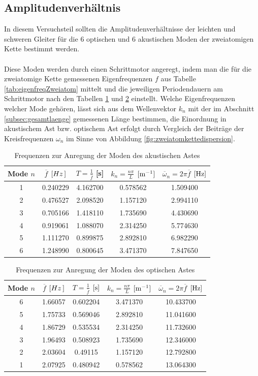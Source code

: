 \documentclass[a4paper,titlepage]{scrartcl}
\numberwithin{equation}{section}
\begin{document}
\subsection{Amplitudenverhältnis}
In diesem Versuchsteil sollten die Amplitudenverhältnisse der leichten und schweren Gleiter für die 6 optischen und 6 akustischen Moden der zweiatomigen Kette bestimmt werden.\\ \\
Diese Moden werden durch einen Schrittmotor angeregt, indem man die für die zweiatomige Kette gemessenen Eigenfrequenzen $f$ aus Tabelle \ref{tab:eigenfreqZweiatom} mittelt und die jeweiligen Periodendauern am Schrittmotor nach den Tabellen \ref{tab:akustisch} und \ref{tab:optisch} einstellt. Welche Eigenfrequenzen welcher Mode gehören, lässt sich aus dem Wellenvektor $k_n$ mit der im Abschnitt \ref{subsec:gesamtlaenge} gemessenen Länge bestimmen, die Einordnung in akustischem Ast bzw. optischem Ast erfolgt durch Vergleich der Beiträge der Kreisfrequenzen $\omega_n$ im Sinne von Abbildung \ref{fig:zweiatomkettedispersion}.
\begin{table}[H]
\centering
\begin{tabular}{c||c|c||c|c}
Mode $n$ & $\overline{f}$ $[\unit[Hz]]$ & $T=\frac{1}{\overline{f}}$ [\unit[]{s}] & $k_n=\frac{n \pi}{L}$ $[\unit[]{m^{-1}}]$ & $\overline{\omega}_n=2 \pi \overline{f}$ $[\unit[]{Hz}]$\\
\hline
1 & 0.240229 & 4.162700 & 0.578562 & 1.509400\\
2 & 0.476527 & 2.098520 & 1.157120 & 2.994110\\
3 & 0.705166 & 1.418110 & 1.735690 & 4.430690\\
4 & 0.919061 & 1.088070 & 2.314250 & 5.774630\\
5 & 1.111270 & 0.899875 & 2.892810 & 6.982290\\
6 & 1.248990 & 0.800645 & 3.471370 & 7.847650
\end{tabular}
\caption{Frequenzen zur Anregung der Moden des akustischen Astes}
\label{tab:akustisch}
\end{table}
\begin{table}[H]
\centering
\begin{tabular}{c|c|c||c|c}
Mode $n$ & $\overline{f}$ $[\unit[Hz]]$ & $T=\frac{1}{\overline{f}}$ $[\unit[]{s}]$ & $k_n=\frac{n \pi}{L}$ $[\unit[]{m^{-1}}]$ & $\overline{\omega}_n=2 \pi \overline{f}$ $[\unit[]{Hz}]$\\
\hline
6 & 1.66057 & 0.602204 & 3.471370 & 10.433700\\
5 & 1.75733 & 0.569046 & 2.892810 & 11.041600\\
4 & 1.86729 & 0.535534 & 2.314250 & 11.732600\\
3 & 1.96493 & 0.508923 & 1.735690 & 12.346000\\
2 & 2.03604& 0.49115 & 1.157120 & 12.792800\\
1 & 2.07925 & 0.480942 & 0.578562 & 13.064300
\end{tabular}
\caption{Frequenzen zur Anregung der Moden des optischen Astes}
\label{tab:optisch}
\end{table}
\end{document}

